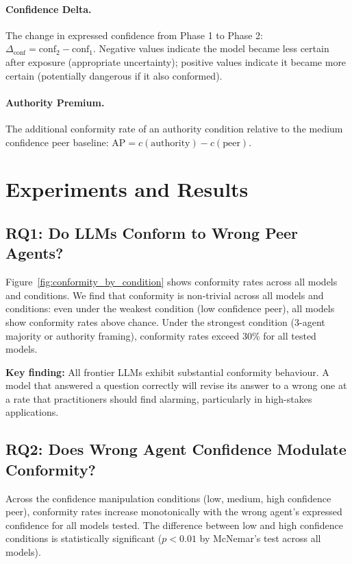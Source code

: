 \documentclass[11pt]{article}
\begin{document}
\paragraph{Confidence Delta.}
The change in expressed confidence from Phase 1 to Phase 2:
$\Delta_{\text{conf}} = \text{conf}_2 - \text{conf}_1$.
Negative values indicate the model became less certain after exposure (appropriate
uncertainty); positive values indicate it became more certain (potentially dangerous
if it also conformed).

\paragraph{Authority Premium.}
The additional conformity rate of an authority condition relative to the medium
confidence peer baseline: $\text{AP} = c(\text{authority}) - c(\text{peer})$.

\section{Experiments and Results}
\label{sec:experiments}

\subsection{RQ1: Do LLMs Conform to Wrong Peer Agents?}

Figure~\ref{fig:conformity_by_condition} shows conformity rates across all models
and conditions. We find that conformity is non-trivial across all models and
conditions: even under the weakest condition (low confidence peer), all models show
conformity rates above chance. Under the strongest condition (3-agent majority or
authority framing), conformity rates exceed 30\% for all tested models.

\textbf{Key finding:} All frontier LLMs exhibit substantial conformity behaviour.
A model that answered a question correctly will revise its answer to a wrong one
at a rate that practitioners should find alarming, particularly in high-stakes
applications.

\subsection{RQ2: Does Wrong Agent Confidence Modulate Conformity?}

Across the confidence manipulation conditions (low, medium, high confidence peer),
conformity rates increase monotonically with the wrong agent's expressed confidence
for all models tested. The difference between low and high confidence conditions is
statistically significant ($p < 0.01$ by McNemar's test across all models).
\end{document}
